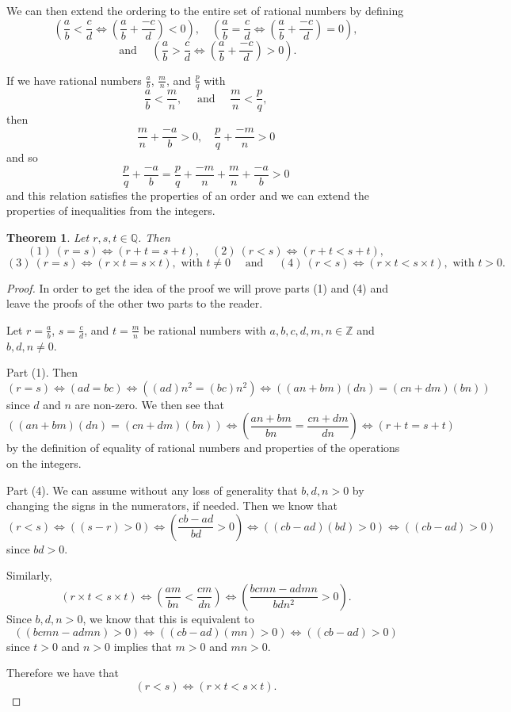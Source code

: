 \documentclass[
]{book}
\newtheorem{theorem}{Theorem}[chapter]
\theoremstyle{definition}
\theoremstyle{definition}
\theoremstyle{definition}
\theoremstyle{definition}
\theoremstyle{remark}
\begin{document}
We can then extend the ordering to the entire set of rational numbers by defining
\[\left(\frac{a}{b} < \frac{c}{d} \Leftrightarrow \left(\frac{a}{b} + \frac{-c}{d}\right) <0 \right), \quad
\left(\frac{a}{b} = \frac{c}{d} \Leftrightarrow \left(\frac{a}{b} + \frac{-c}{d}\right) = 0 \right),\]
\[\mbox{ and } \quad \left(\frac{a}{b} > \frac{c}{d} \Leftrightarrow \left(\frac{a}{b} + \frac{-c}{d}\right) > 0 \right).\]

If we have rational numbers \(\frac{a}{b}\), \(\frac{m}{n}\), and \(\frac{p}{q}\) with
\[\frac{a}{b} < \frac{m}{n}, \quad \mbox{ and } \quad \frac{m}{n} < \frac{p}{q},\] then
\[\frac{m}{n}+ \frac{-a}{b} >0, \quad \frac{p}{q}+ \frac{-m}{n} >0\] and so
\[\frac{p}{q} + \frac{-a}{b} = \frac{p}{q}+ \frac{-m}{n} + \frac{m}{n}+ \frac{-a}{b}>0\]
and this relation satisfies the properties of an order and we can extend the properties of inequalities from the integers.

\begin{theorem}
Let \(r,s,t\in \mathbb{Q}\). Then \[(1) \: (r=s) \Leftrightarrow (r+t=s+t),  \quad (2) \: (r<s) \Leftrightarrow (r+t<s+t),\]
\[(3) \: (r=s) \Leftrightarrow (r\times t=s\times t), \mbox{ with } t\neq 0 \quad \mbox{ and } \quad (4) \: (r<s) \Leftrightarrow (r\times t<s\times t), \mbox{ with } t> 0.\]
\end{theorem}

\begin{proof}
In order to get the idea of the proof we will prove parts (1) and (4) and leave the proofs of the other two parts to the reader.

Let \(r=\frac{a}{b}\), \(s=\frac{c}{d}\), and \(t=\frac{m}{n}\) be rational numbers with \(a,b,c,d,m,n\in \mathbb{Z}\) and \(b,d,n\neq 0\).

Part (1). Then \[(r=s) \Leftrightarrow (ad=bc) \Leftrightarrow \left( (ad)n^2 = (bc) n^2 \right) \Leftrightarrow \left( (an+bm)(dn)=(cn+dm)(bn) \right) \] since \(d\) and \(n\) are non-zero. We then see that
\[\left( (an+bm)(dn)=(cn+dm)(bn) \right) \Leftrightarrow \left(\frac{an+bm}{bn} = \frac{cn+dm}{dn}\right) \Leftrightarrow  (r+t=s+t)\] by the definition of equality of rational numbers and properties of the operations on the integers.

Part (4). We can assume without any loss of generality that \(b,d,n >0\) by changing the signs in the numerators, if needed. Then we know that \[ (r<s) \Leftrightarrow ((s-r)>0 ) \Leftrightarrow \left( \frac{cb-ad}{bd} >0 \right) \Leftrightarrow \left( (cb-ad)(bd) >0\right) \Leftrightarrow \left( (cb-ad) >0\right)\] since \(bd>0\).

Similarly, \[\left( r\times t < s\times t\right) \Leftrightarrow \left( \frac{am}{bn} < \frac{cm}{dn} \right) \Leftrightarrow \left( \frac{bcmn - admn}{bdn^2} >0\right). \] Since \(b,d,n >0\), we know that this is equivalent to
\[\left( (bcmn-admn)>0 \right) \Leftrightarrow \left( (cb-ad)(mn) > 0 \right) \Leftrightarrow \left( (cb-ad) >0 \right)\] since \(t>0\) and \(n>0\) implies that \(m>0\) and \(mn>0\).

Therefore we have that \[(r<s) \Leftrightarrow \left( r\times t < s\times t\right).\]
\end{proof}
\end{document}
